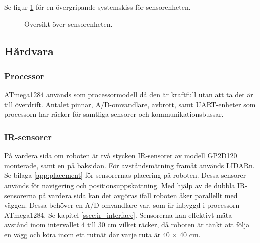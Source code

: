 \documentclass[a4paper,11pt]{article}
\begin{document}
Se figur \ref{fig:unitSensor} för en övergripande systemskiss för sensorenheten.

\begin{figure}[h!]
	\caption{Översikt över sensorenheten.}
	\label{fig:unitSensor}
\end{figure}

\clearpage

\subsection{Hårdvara}

\subsubsection{Processor}
ATmega1284 används som processormodell då den är kraftfull utan att ta det är till överdrift. Antalet pinnar, A/D-omvandlare, avbrott, samt UART-enheter som processorn har räcker för samtliga sensorer och kommunikationsbussar.

\subsubsection{IR-sensorer} \label{sssec:sonicsensors}
På vardera sida om roboten är två stycken IR-sensorer av modell GP2D120 monterade, samt en på baksidan. För avståndsmätning framåt används LIDARn. Se bilaga \ref{app:placement} för sensorernas placering på roboten. Dessa sensorer används för navigering och positionsuppskattning. Med hjälp av de dubbla IR-sensorerna på vardera sida kan det avgöras ifall roboten åker parallellt med väggen. Dessa behöver en A/D-omvandlare var, som är inbyggd i processorn ATmega1284. Se kapitel \ref{ssec:ir_interface}. Sensorerna kan effektivt mäta avstånd inom intervallet 4 till 30 cm vilket räcker, då roboten är tänkt att följa en vägg och köra inom ett rutnät där varje ruta är 40 $\times$ 40 cm.
\end{document}
